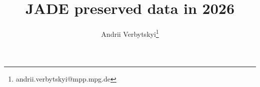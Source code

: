 \documentclass[zpreprint,zbstnp,final]{zeus_paper}
\title{JADE preserved data in 2026}
\author[b]{Andrii Verbytskyi\thanks{andrii.verbytskyi@mpp.mpg.de}}
\affil[b]{Max-Planck-Institut f\"{u}r Physik}
\begin{document}
\maketitle
\tableofcontents

{{\raggedright}}\vfill\eject
\clearpage
\end{document}
